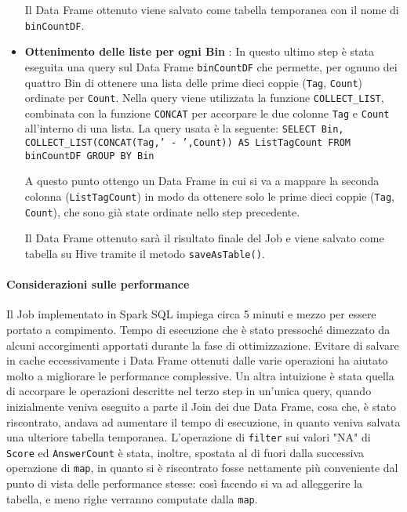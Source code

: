 \begin{itemize}
    Il Data Frame ottenuto viene salvato come tabella temporanea con il nome di \texttt{binCountDF}.
    \item \textbf{Ottenimento delle liste per ogni Bin} : In questo ultimo step è stata eseguita una query sul Data Frame
    \texttt{binCountDF} che permette, per ognuno dei quattro Bin di ottenere una lista delle prime dieci coppie
    (\texttt{Tag}, \texttt{Count}) ordinate per \texttt{Count}.
    Nella query viene utilizzata la funzione \texttt{COLLECT_LIST}, combinata con la funzione \texttt{CONCAT} per accorpare
    le due colonne \texttt{Tag} e \texttt{Count} all'interno di una lista.
    La query usata è la seguente:
    \texttt{SELECT Bin, COLLECT_LIST(CONCAT(Tag,' - ',Count)) AS ListTagCount FROM binCountDF GROUP BY Bin}

    A questo punto ottengo un Data Frame in cui si va a mappare la seconda colonna (\texttt{ListTagCount}) in modo da ottenere
    solo le prime dieci coppie (\texttt{Tag}, \texttt{Count}), che sono già state ordinate nello step precedente.

    Il Data Frame ottenuto sarà il risultato finale del Job e viene salvato come tabella su Hive tramite il metodo
    \texttt{saveAsTable()}.
  \end{itemize}


  \paragraph{Considerazioni sulle performance}\label{par:job2:spark:performance}

  Il Job implementato in Spark SQL impiega circa 5 minuti e mezzo per essere portato a compimento.
  Tempo di esecuzione che è stato pressoché dimezzato da alcuni accorgimenti apportati durante la fase di ottimizzazione.
  Evitare di salvare in cache eccessivamente i Data Frame ottenuti dalle varie operazioni ha aiutato molto a migliorare
  le performance complessive.
  Un altra intuizione è stata quella di accorpare le operazioni descritte nel terzo step in un'unica query, quando inizialmente
  veniva eseguito a parte il Join dei due Data Frame, cosa che, è stato riscontrato, andava ad aumentare il tempo di esecuzione,
  in quanto veniva salvata una ulteriore tabella temporanea.
  L'operazione di \texttt{filter} sui valori "NA" di \texttt{Score} ed \texttt{AnswerCount} è stata, inoltre, spostata al di fuori
  dalla successiva operazione di \texttt{map}, in quanto si è riscontrato fosse nettamente più conveniente dal punto di vista
  delle performance stesse: così facendo si va ad alleggerire la tabella, e meno righe verranno computate dalla \texttt{map}.

